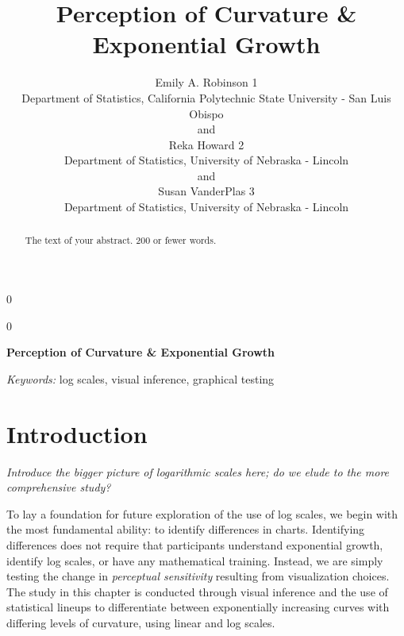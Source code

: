 \documentclass[12pt]{article}
\newcommand{\blind}{0}
\begin{document}
\def\spacingset#1{\renewcommand{\baselinestretch}%
{#1}\small\normalsize} \spacingset{1}



\blind
{
  \title{\bf Perception of Curvature \& Exponential Growth}

  \author{
        Emily A. Robinson 1 \\
    Department of Statistics, California Polytechnic State University -
San Luis Obispo\\
     and \\     Reka Howard 2 \\
    Department of Statistics, University of Nebraska - Lincoln\\
     and \\     Susan VanderPlas 3 \\
    Department of Statistics, University of Nebraska - Lincoln\\
      }
  \maketitle
} \fi

\blind
{
  \bigskip
  \bigskip
  \bigskip
  \begin{center}
    {\LARGE\bf Perception of Curvature \& Exponential Growth}
  \end{center}
  \medskip
} \fi

\bigskip
\begin{abstract}
The text of your abstract. 200 or fewer words.
\end{abstract}

\noindent%
{\it Keywords:} log scales, visual inference, graphical testing
\vfill

\newpage
\spacingset{1.45} %

\hypertarget{introduction}{%
\section{Introduction}\label{introduction}}

\emph{Introduce the bigger picture of logarithmic scales here; do we
elude to the more comprehensive study?}

To lay a foundation for future exploration of the use of log scales, we
begin with the most fundamental ability: to identify differences in
charts. Identifying differences does not require that participants
understand exponential growth, identify log scales, or have any
mathematical training. Instead, we are simply testing the change in
\emph{perceptual sensitivity} resulting from visualization choices. The
study in this chapter is conducted through visual inference and the use
of statistical lineups \citep{buja_statistical_2009} to differentiate
between exponentially increasing curves with differing levels of
curvature, using linear and log scales.
\end{document}
